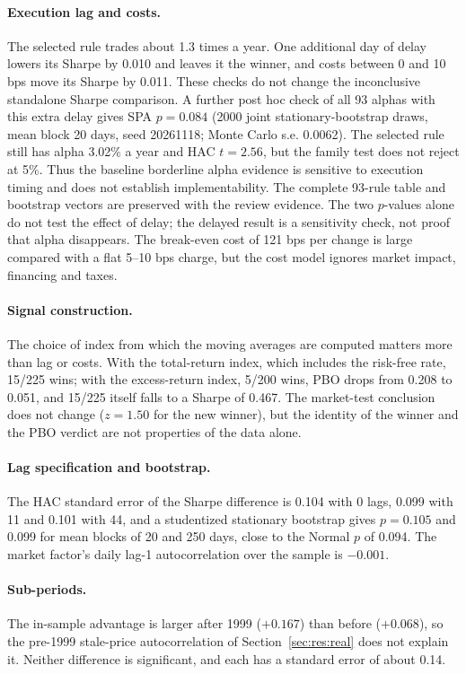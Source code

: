 \documentclass[11pt,a4paper]{article}
\begin{document}
\paragraph{Execution lag and costs.} The selected rule trades about 1.3 times a year. One additional day of delay lowers its Sharpe by 0.010 and leaves it the winner, and costs between 0 and 10 bps move its Sharpe by 0.011. These checks do not change the inconclusive standalone Sharpe comparison. A further post hoc check of all 93 alphas with this extra delay gives SPA $p=0.084$ (2000 joint stationary-bootstrap draws, mean block 20 days, seed 20261118; Monte Carlo s.e. 0.0062). The selected rule still has alpha 3.02\% a year and HAC $t=2.56$, but the family test does not reject at 5\%. Thus the baseline borderline alpha evidence is sensitive to execution timing and does not establish implementability. The complete 93-rule table and bootstrap vectors are preserved with the review evidence. The two $p$-values alone do not test the effect of delay; the delayed result is a sensitivity check, not proof that alpha disappears. The break-even cost of 121 bps per change is large compared with a flat 5--10 bps charge, but the cost model ignores market impact, financing and taxes.

\paragraph{Signal construction.} The choice of index from which the moving averages are computed matters more than lag or costs. With the total-return index, which includes the risk-free rate, 15/225 wins; with the excess-return index, 5/200 wins, PBO drops from 0.208 to 0.051, and 15/225 itself falls to a Sharpe of 0.467. The market-test conclusion does not change ($z=1.50$ for the new winner), but the identity of the winner and the PBO verdict are not properties of the data alone.

\paragraph{Lag specification and bootstrap.} The HAC standard error of the Sharpe difference is 0.104 with 0 lags, 0.099 with 11 and 0.101 with 44, and a studentized stationary bootstrap gives $p=0.105$ and 0.099 for mean blocks of 20 and 250 days, close to the Normal $p$ of 0.094. The market factor's daily lag-1 autocorrelation over the sample is $-0.001$.

\paragraph{Sub-periods.} The in-sample advantage is larger after 1999 ($+0.167$) than before ($+0.068$), so the pre-1999 stale-price autocorrelation of Section~\ref{sec:res:real} does not explain it. Neither difference is significant, and each has a standard error of about 0.14.
\end{document}
